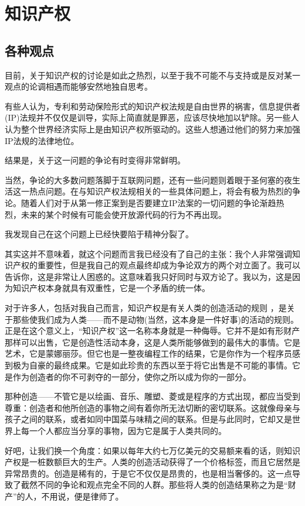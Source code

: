 \chapter{知识产权}

 
\section{各种观点}

目前，关于知识产权的讨论是如此之热烈，以至于我不可能不与支持或是反对某一观点的论调相遇而能够安然地独自思考。

有些人认为，专利和劳动保险形式的知识产权法规是自由世界的祸害，信息提供者(IP)法规并不仅仅是训导，实际上简直就是罪恶，应该尽快地加以铲除。另一些人认为整个世界经济实际上是由知识产权所驱动的。这些人想通过他们的努力来加强IP法规的法律地位。

结果是，关于这一问题的争论有时变得非常鲜明。

当然，争论的大多数问题落脚于互联网问题，还有一些问题则着眼于圣何塞的夜生活这一热点问题。在与知识产权法规相关的一些具体问题上，将会有极为热烈的争论。随着人们对于从第一修正案到是否要建立IP法案的一切问题的争论渐趋热烈，未来的某个时候有可能会使开放源代码的行为不再出现。

我发现自己在这个问题上已经快要陷于精神分裂了。

其实这并不意味着，就这个问题而言我已经没有了自己的主张：我个人非常强调知识产权的重要性，但是我自己的观点最终却成为争论双方的两个对立面了。我可以告诉你，这是非常让人困惑的。这意味着我只好同时与双方论了。我以为，这是因为知识产权本身就具有双重性，它是一个矛盾的统一体。

对于许多人，包括对我自己而言，知识产权是有关人类的创造活动的规则 ，是关于那些使我们成为人类——而不是动物(当然，这本身是一件好事)的活动的规则。正是在这个意义上，“知识产权”这一名称本身就是一种侮辱。它并不是如有形财产那样可以出售，它是创造性活动本身，这是人类所能够做到的最伟大的事情。它是艺术，它是蒙娜丽莎。但它也是一整夜编程工作的结果，它是你作为一个程序员感到极为自豪的最终成果。它是如此珍贵的东西以至于将它出售是不可能的事情。它是作为创造者的你不可剥夺的一部分，使你之所以成为你的一部分。

那种创造——不管它是以绘画、音乐、雕塑、菱或是程序的方式出现，都应当受到尊重：创造者和他所创造的事物之间有着你所无法切断的密切联系。这就像母亲与孩子之间的联系，或者如同中国菜与味精之间的联系。但是与此同时，它却又是世界上每一个人都应当分享的事物，因为它是属于人类共同的。

好吧，让我们换一个角度：如果以每年大约七万亿美元的交易额来看的话，则知识产权是一桩数额巨大的生产。人类的创造活动获得了一个价格标签，而且它居然是异常昂贵的。创造是稀有的，于是它不仅仅是昂贵的，也是相当奢侈的。这一点导致了截然不同的争论和观点完全不同的人群。那些将人类的创造结果称之为是“财产”的人，不用说，便是律师了。

